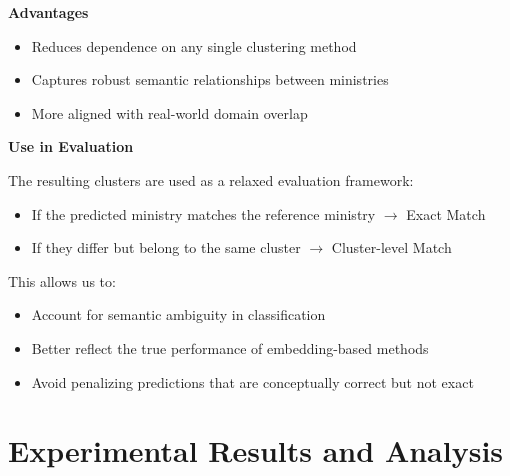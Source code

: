 \documentclass{report}
\begin{document}
\textbf{Advantages}

\begin{itemize}[leftmargin=+.5in]
    \item Reduces dependence on any single clustering method
    \item Captures robust semantic relationships between ministries
    \item More aligned with real-world domain overlap
\end{itemize}

\textbf{Use in Evaluation}

The resulting clusters are used as a relaxed evaluation framework:

\begin{itemize}[leftmargin=+.5in]
    \item If the predicted ministry matches the reference ministry $\rightarrow$ Exact Match
    \item If they differ but belong to the same cluster $\rightarrow$ Cluster-level Match
\end{itemize}

This allows us to:

\begin{itemize}[leftmargin=+.5in]
    \item Account for semantic ambiguity in classification
    \item Better reflect the true performance of embedding-based methods
    \item Avoid penalizing predictions that are conceptually correct but not exact
\end{itemize}

\section{Experimental Results and Analysis}
\end{document}

